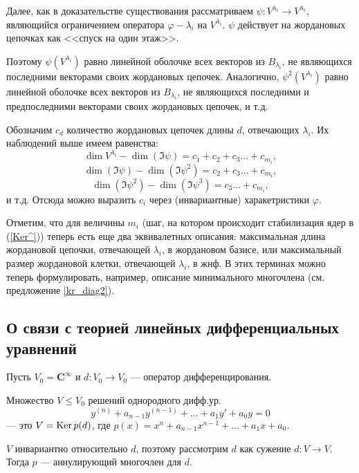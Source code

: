\otstup

Далее, как в доказательстве существования
рассматриваем $\psi : V^{\lambda_i} \to V^{\lambda_i}$, 
являющийся ограничением оператора $\varphi - \lambda_i$ на $V^{\lambda_i}$.
$\psi$ действует на жордановых цепочках как <<спуск на один этаж>>.

Поэтому $\psi (V^{\lambda_i}) $ равно линейной оболочке  всех векторов из $B_{\lambda _i} $, 
не являющихся последними векторами своих жордановых цепочек.
Аналогично, $\psi ^2(V^{\lambda_i}) $ равно линейной оболочке  всех векторов из $B_{\lambda _i} $, 
не являющихся последними и предпоследними векторами своих жордановых цепочек, и т.д.

Обозначим  $c_d$ количество жордановых цепочек длины $d$, отвечающих $\lambda _i$. Их наблюдений выше имеем равенства:
$$ \dim V^{\lambda _i} - \dim (\Im \psi ) = c_1+c_2+c_3 \ldots + c_{m_i},   $$
$$ \dim (\Im \psi ) - \dim (\Im \psi ^2) = c_2+c_3 \ldots + c_{m_i},   $$
$$ \dim (\Im \psi ^2) - \dim (\Im \psi ^3) = c_3 \ldots + c_{m_i},   $$
и т.д.
Отсюда можно выразить $c_i$ через (инвариантные) харакетристики $\varphi$.


\otstup


Отметим, что для величины $m_i$ (шаг, на котором происходит стабилизация ядер в (\ref{Ker^}))
теперь есть еще два эквивалетных описания: %
максимальная длина жордановой цепочки, отвечающей $\lambda _i$, в жордановом базисе,
или максимальный размер жордановой клетки, отвечающей $\lambda _i$, в жнф.
В этих терминах можно теперь формулировать, например, 
описание минимального многочлена (см. предложение \ref{kr_diag2}).



\subsection{О связи с теорией линейных дифференциальных уравнений}

Пусть $V_0= \mathbf{C}^{\infty}$ и $d: V_0 \to V_0$ --- оператор дифференцирования. 

Множество $V\leq V_0$ решений однородного дифф.ур. 
$$y^{(n)}+a_{n-1}y^{(n-1)}+\ldots +a_1y'+a_0y=0$$
--- это $V = \mathop{\rm Ker}\nolimits p(d)$, где $p(x) = x^{n}+a_{n-1}x^{n-1}+\ldots +a_1x+a_0$.

\otstup

$V$ инвариантно относительно $d$, поэтому рассмотрим $d$ как сужение $d: V\to V$.\\
Тогда $p$ --- аннулирующий многочлен для $d$. \\

